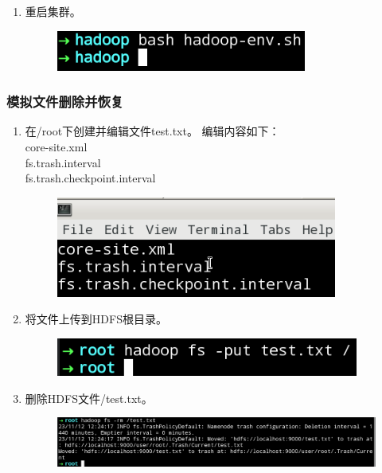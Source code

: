 \documentclass {article}
\begin{document}
\begin{enumerate}
					\item 重启集群。
					\begin{figure}[H]
						\centering
						\includegraphics{figures/fig14.png}
					\end{figure}
				\end{enumerate}
			
			\subsubsection{模拟文件删除并恢复}
				\begin{enumerate}
					\item 在/root下创建并编辑文件test.txt。
					编辑内容如下：\\
					core-site.xml \\
					fs.trash.interval \\
					fs.trash.checkpoint.interval
					
					\begin{figure}[H]
						\centering
						\includegraphics{figures/fig15.png}
					\end{figure}
				
					\item 将文件上传到HDFS根目录。
					\begin{figure}[H]
						\centering
						\includegraphics{figures/fig16.png}
					\end{figure}
				
					\item 删除HDFS文件/test.txt。
					\begin{figure}[H]
						\centering
						\includegraphics[width=4.5in]{figures/fig17.png}
					\end{figure}
				

\end{enumerate}
\end{document}
